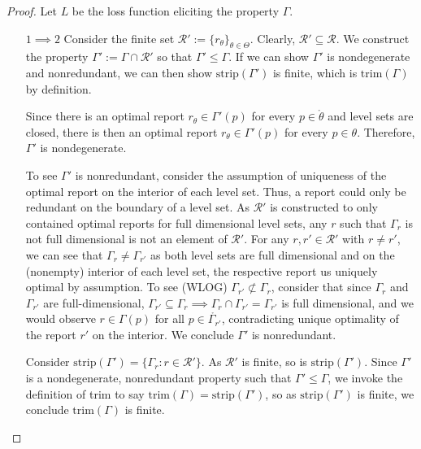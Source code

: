 \documentclass[12pt]{article}
\newcommand{\R}{\mathcal{R}}
\newcommand{\inter}[1]{\mathring{#1}}%
\newcommand{\trim}{\mathrm{trim}}
\newcommand{\strip}{\mathrm{strip}}
\begin{document}
\begin{proof}
Let $L$ be the loss function eliciting the property $\Gamma$.

\begin{enumerate}
\item [$1 \implies 2$]
Consider the finite set $\R' := \{r_\theta\}_{\theta \in \Theta}$.
Clearly, $\R' \subseteq \R$.
We construct the property $\Gamma' := \Gamma \cap \R'$ so that $\Gamma' \leq \Gamma$.
If we can show $\Gamma'$ is nondegenerate and nonredundant, we can then show $\strip(\Gamma')$ is finite, which is $\trim(\Gamma)$ by definition.

Since there is an optimal report $r_\theta \in \Gamma'(p)$ for every $p \in \inter{\theta}$ and level sets are closed, there is then an optimal report $r_\theta \in \Gamma'(p)$ for every $p \in \theta$.
Therefore, $\Gamma'$ is nondegenerate.

To see $\Gamma'$ is nonredundant, consider the assumption of uniqueness of the optimal report on the interior of each level set.
Thus, a report could only be redundant on the boundary of a level set.
As $\R'$ is constructed to only contained optimal reports for full dimensional level sets, any $r$ such that $\Gamma_r$ is not full dimensional is not an element of $\R'$.
For any $r, r' \in \R'$ with $r \neq r'$, we can see that $\Gamma_r \neq \Gamma_{r'}$ as both level sets are full dimensional and  on the (nonempty) interior of each level set, the respective report us uniquely optimal by assumption.
To see (WLOG) $\Gamma_{r'} \not \subset \Gamma_r$, consider that since $\Gamma_r$ and $\Gamma_{r'}$ are full-dimensional, $\Gamma_{r'} \subseteq \Gamma_r \implies \Gamma_r \cap \Gamma_{r'} = \Gamma_{r'}$ is full dimensional, and we would observe $ r \in \Gamma(p)$ for all $p \in \inter{\Gamma_{r'}}$, contradicting unique optimality of the report $r'$ on the interior. 
We conclude $\Gamma'$ is nonredundant.


Consider $\strip(\Gamma') = \{\Gamma_r : r \in \R' \}$.
As $\R'$ is finite, so is $\strip(\Gamma')$.
Since $\Gamma'$ is a  nondegenerate, nonredundant property such that $\Gamma' \leq \Gamma$, we invoke the definition of trim to say $\trim(\Gamma) = \strip(\Gamma')$, so as $\strip(\Gamma')$ is finite, we conclude $\trim(\Gamma)$ is finite.



\end{enumerate}
\end{proof}
\end{document}
